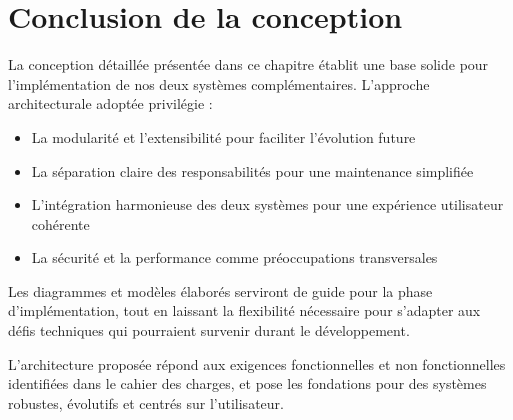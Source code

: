 \section{Conclusion de la conception}

La conception détaillée présentée dans ce chapitre établit une base solide pour l'implémentation de nos deux systèmes complémentaires. L'approche architecturale adoptée privilégie :

\begin{itemize}
  \item La modularité et l'extensibilité pour faciliter l'évolution future
  
  \item La séparation claire des responsabilités pour une maintenance simplifiée
  
  \item L'intégration harmonieuse des deux systèmes pour une expérience utilisateur cohérente
  
  \item La sécurité et la performance comme préoccupations transversales
\end{itemize}

Les diagrammes et modèles élaborés serviront de guide pour la phase d'implémentation, tout en laissant la flexibilité nécessaire pour s'adapter aux défis techniques qui pourraient survenir durant le développement.

L'architecture proposée répond aux exigences fonctionnelles et non fonctionnelles identifiées dans le cahier des charges, et pose les fondations pour des systèmes robustes, évolutifs et centrés sur l'utilisateur. 